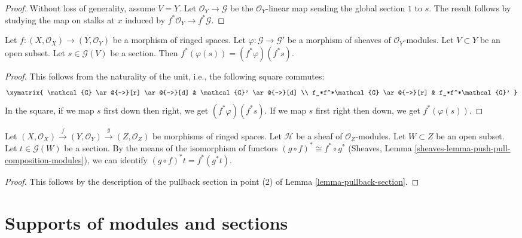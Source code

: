 \begin{proof}
Without loss of generality, assume $V=Y$.
Let $\mathcal{O}_Y\to\mathcal{G}$ be the
$\mathcal{O}_Y$-linear map sending the global section $1$ to $s$.
The result follows by studying the map on stalks at
$x$ induced by $f^*\mathcal{O}_Y\to f^*\mathcal{G}$.
\end{proof}

\begin{lemma}
\label{lemma-pullback-section-morphism}
Let $f : (X, \mathcal{O}_X) \to (Y, \mathcal{O}_Y)$
be a morphism of ringed spaces.
Let $\varphi:\mathcal{G}\to\mathcal{G}'$ be a morphism of
sheaves of $\mathcal{O}_Y$-modules.
Let $V\subset Y$ be an open subset.
Let $s\in\mathcal{G}(V)$ be a section.
Then $f^*(\varphi(s))=(f^*\varphi)(f^*s)$.
\end{lemma}

\begin{proof}
This follows from the naturality of the unit, i.e.,
the following square commutes:
$$
\xymatrix{
	\mathcal{G} \ar@{->}[r] \ar@{->}[d] & \mathcal{G}' \ar@{->}[d] \\
	f_*f^*\mathcal{G} \ar@{->}[r] & f_*f^*\mathcal{G}'
}
$$
In the square, if we map $s$ first down then right,
we get $(f^*\varphi)(f^*s)$. If we map $s$ first right then down,
we get $f^*(\varphi(s))$.
\end{proof}

\begin{lemma}
\label{lemma-pullback-section-functorial}
Let
$(X,\mathcal{O}_X)
\xrightarrow{f}(Y,\mathcal{O}_Y)
\xrightarrow{g}(Z,\mathcal{O}_Z)$ be morphisms of ringed spaces.
Let $\mathcal{H}$ be a sheaf of $\mathcal{O}_Z$-modules.
Let $W\subset Z$ be an open subset.
Let $t\in\mathcal{G}(W)$ be a section.
By the means of the isomorphism of functors
$(g\circ f)^*\cong f^*\circ g^*$
(Sheaves, Lemma \ref{sheaves-lemma-push-pull-composition-modules}),
we can identify $(g\circ f)^*t=f^*(g^*t)$.
\end{lemma}

\begin{proof}
This follows by the description of the pullback section
in point (2) of Lemma \ref{lemma-pullback-section}.
\end{proof}





\section{Supports of modules and sections}
\label{section-support}

